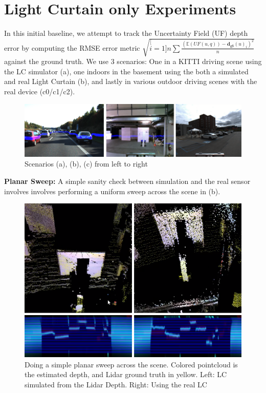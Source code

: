 
\section{Light Curtain only Experiments}

In this initial baseline, we attempt to track the Uncertainty Field (UF) depth error by computing the RMSE error metric $\sqrt{\stackrel[i=1]{n}{\sum}\frac{\left(\mathbb{E}\left(UF\left(u,q\right)\right)-\mathbf{d_{gt}}(u)_{i}\right)^{2}}{n}}$ against the ground truth. We use 3 scenarios: One in a KITTI driving scene using the LC simulator (a), one indoors in the basement using the both a simulated and real Light Curtain (b), and lastly in various outdoor driving scenes with the real device (c0/c1/c2). 

\begin{figure}[h]
   \centering
   \begin{minipage}{0.5\textwidth}
       \centering
       \includegraphics[width=1.0\textwidth]{figures/exp.png}
   \end{minipage}\hfill
   \centering
   \caption{Scenarios (a), (b), (c) from left to right}
   \label{fig:exp}
\end{figure}

\textbf{Planar Sweep:} A simple sanity check between simulation and the real sensor involves involves performing a uniform sweep across the scene in (b). 

\begin{figure}
   \centering
   \begin{minipage}{0.5\textwidth}
       \centering
       \includegraphics[width=1.0\textwidth]{figures/sweep.png}
   \end{minipage}\hfill
   \centering
   \caption{Doing a simple planar sweep across the scene. Colored pointcloud is the estimated depth, and Lidar ground truth in yellow. Left: LC simulated from the Lidar Depth. Right: Using the real LC}
   \label{fig:planarsweep}
\end{figure}

